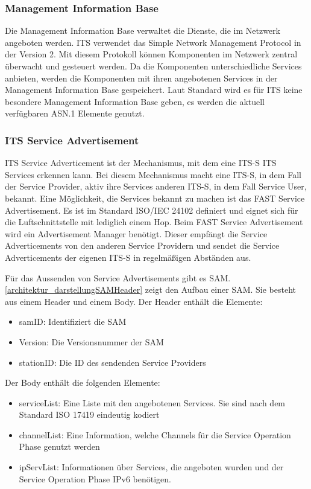 \subsubsection{Management Information Base}
Die Management Information Base verwaltet die Dienste, die im Netzwerk angeboten werden. \ac{ITS} verwendet das Simple Network Management Protocol in der Version 2. Mit diesem Protokoll können Komponenten im Netzwerk zentral überwacht und gesteuert werden. Da die Komponenten unterschiedliche Services anbieten, werden die Komponenten mit ihren angebotenen Services in der Management Information Base gespeichert.
Laut Standard \cite{ts102723-2} wird es für \ac{ITS} keine besondere Management Information Base geben, es werden die aktuell verfügbaren \ac{ASN.1} Elemente genutzt. 


\subsubsection{ITS Service Advertisement}
\ac{ITS} Service Adverticement ist der Mechanismus, mit dem eine \ac{ITS-S} \ac{ITS} Services erkennen kann. Bei diesem Mechanismus macht eine \ac{ITS-S}, in dem Fall der Service Provider, aktiv ihre Services anderen \ac{ITS-S}, in dem Fall Service User, bekannt. Eine Möglichkeit, die Services bekannt zu machen ist das FAST Service Advertisement. Es ist im Standard ISO/IEC 24102 definiert und eignet sich für die Luftschnittstelle mit lediglich einem Hop. Beim FAST Service Advertisement wird ein Advertisement Manager benötigt. Dieser empfängt die Service Adverticements von den anderen Service Providern und sendet die Service Adverticements der eigenen \ac{ITS-S} in regelmäßigen Abständen aus.

Für das Aussenden von Service Advertisements gibt es \ac{SAM}. \autoref{architektur_darstellungSAMHeader} zeigt den Aufbau einer \ac{SAM}. Sie besteht aus einem Header und einem Body. Der Header enthält die Elemente:

\begin{itemize}
	\item samID: Identifiziert die \ac{SAM}
	\item Version: Die Versionsnummer der \ac{SAM}
	\item stationID: Die ID des sendenden Service Providers
\end{itemize}

Der Body enthält die folgenden Elemente:
\begin{itemize}
	\item serviceList: Eine Liste mit den angebotenen Services. Sie sind nach dem Standard ISO 17419 eindeutig kodiert
	\item channelList:  Eine Information, welche Channels für die Service Operation Phase genutzt werden
	\item ipServList: Informationen über Services, die angeboten wurden und der Service Operation Phase IPv6 benötigen.
\end{itemize} 


